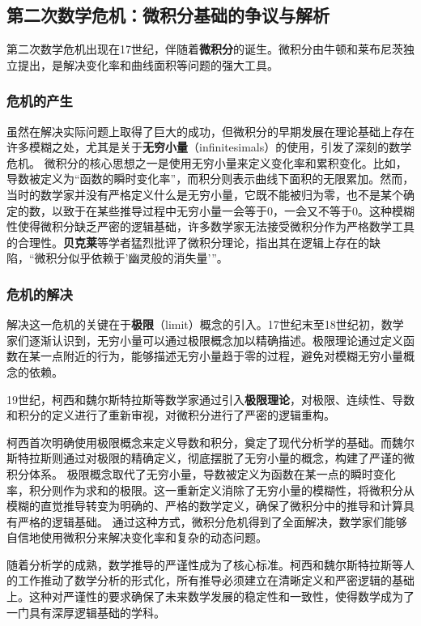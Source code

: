 \subsection{第二次数学危机：微积分基础的争议与解析}
第二次数学危机出现在17世纪，伴随着{\bf 微积分}的诞生。微积分由牛顿和莱布尼茨独立提出，是解决变化率和曲线面积等问题的强大工具。

\subsubsection{危机的产生}
虽然在解决实际问题上取得了巨大的成功，但微积分的早期发展在理论基础上存在许多模糊之处，尤其是关于{\bf 无穷小量}（infinitesimals）的使用，引发了深刻的数学危机。
微积分的核心思想之一是使用无穷小量来定义变化率和累积变化。比如，导数被定义为“函数的瞬时变化率”，而积分则表示曲线下面积的无限累加。然而，当时的数学家并没有严格定义什么是无穷小量，它既不能被归为零，也不是某个确定的数，以致于在某些推导过程中无穷小量一会等于0，一会又不等于0。这种模糊性使得微积分缺乏严密的逻辑基础，许多数学家无法接受微积分作为严格数学工具的合理性。{\bf 贝克莱}等学者猛烈批评了微积分理论，指出其在逻辑上存在的缺陷，“微积分似乎依赖于'幽灵般的消失量'”。

\subsubsection{危机的解决}
解决这一危机的关键在于{\bf 极限}（limit）概念的引入。17世纪末至18世纪初，数学家们逐渐认识到，无穷小量可以通过极限概念加以精确描述。极限理论通过定义函数在某一点附近的行为，能够描述无穷小量趋于零的过程，避免对模糊无穷小量概念的依赖。

19世纪，柯西和魏尔斯特拉斯等数学家通过引入{\bf 极限理论}，对极限、连续性、导数和积分的定义进行了重新审视，对微积分进行了严密的逻辑重构。

柯西首次明确使用极限概念来定义导数和积分，奠定了现代分析学的基础。而魏尔斯特拉斯则通过对极限的精确定义，彻底摆脱了无穷小量的概念，构建了严谨的微积分体系。
极限概念取代了无穷小量，导数被定义为函数在某一点的瞬时变化率，积分则作为求和的极限。这一重新定义消除了无穷小量的模糊性，将微积分从模糊的直觉推导转变为明确的、严格的数学定义，确保了微积分中的推导和计算具有严格的逻辑基础。
通过这种方式，微积分危机得到了全面解决，数学家们能够自信地使用微积分来解决变化率和复杂的动态问题。

随着分析学的成熟，数学推导的严谨性成为了核心标准。柯西和魏尔斯特拉斯等人的工作推动了数学分析的形式化，所有推导必须建立在清晰定义和严密逻辑的基础上。这种对严谨性的要求确保了未来数学发展的稳定性和一致性，使得数学成为了一门具有深厚逻辑基础的学科。

